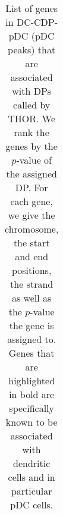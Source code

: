\begin{table}
\begin{tabular}{rllrrcr}
 \end{tabular}
\caption[List of genes associated with pDC peaks]{List of genes in DC-CDP-pDC (pDC peaks) that are associated with DPs called by THOR.
We rank the genes by the $p$-value of the assigned DP.
For each gene, we give the chromosome, the start and end positions, the strand as well as the $p$-value the gene is assigned to.
Genes that are highlighted in bold are specifically known to be associated with dendritic cells and in particular pDC cells.}
\label{tab_res_dc_pDC_gene_list}
\end{table}